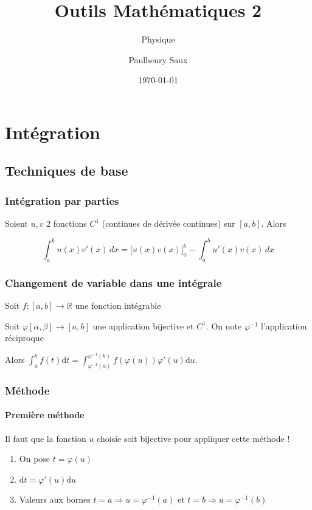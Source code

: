 \documentclass[french]{yLectureNote}
\title{Outils Mathématiques 2}
\subtitle{Physique}
\author{Paulhenry Saux}
\date{\today}
\begin{document}
\chapter{Intégration}

\section{Techniques de base}
\subsection{Intégration par parties}
Soient $u,v$ 2 fonctions $C^1$ (continues de dérivée continues) sur $[a,b]$. Alors
\begin{theorem}[Formule]
\[\int_a^b u(x) v'(x) \, dx  = \Big[u(x) v(x)\Big]_a^b - \int_a^b u'(x) v(x) \, dx\]
\end{theorem}
\subsection{Changement de variable dans une intégrale}
\begin{theorem}[]
Soit $f : [a,b]\to \mathbb{R}$ une fonction intégrable

Soit $\varphi [\alpha,\beta] \to [a,b]$ une application bijective et $C^1$. On note $\varphi^{-1}$ l'application réciproque

Alors $\int^b_a f(t)\mathrm{d}t = \int^{\varphi^{-1}(b)}_{\varphi^{-1}(a)} f(\varphi(u))\varphi'(u)\mathrm{d}u$.
\end{theorem}
\subsection{Méthode}
\subsubsection{Première méthode}
Il faut que la fonction $u$ choisie soit bijective pour appliquer cette méthode !
\begin{enumerate}
 \item On pose $t = \varphi(u)$
 \item $\mathrm{d}t = \varphi'(u)\mathrm{d}u$
 \item Valeurs aux bornes $t=a \Rightarrow u = \varphi^{-1}(a)$ et $t=b \Rightarrow u = \varphi^{-1}(b)$
\end{enumerate}
\end{document}
